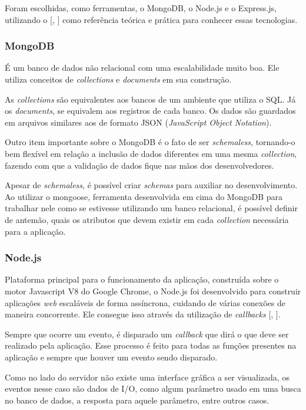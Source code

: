 \documentclass[
	12pt,				%
	oneside,			%
	a4paper,			%
	brazil				%
]{abntex2}
\newcommand{\citecustom}[1]{[\citeauthoronline{#1}, \citeyear{#1}]}
\begin{document}
Foram escolhidas, como ferramentas, o MongoDB, o Node.js e o Express.js, utilizando o \citecustom{Almeida2016} como referência teórica e prática para conhecer essas tecnologias.

\subsubsection{MongoDB}

É um banco de dados não relacional com uma escalabilidade muito boa. Ele utiliza conceitos de \textit{collections} e \textit{documents} em sua construção. 

As \textit{collections} são equivalentes aos bancos de um ambiente que utiliza o SQL. Já os \textit{documents}, se equivalem aos registros de cada banco. Os dados são guardados em arquivos similares aos de formato JSON (\textit{JavaScript Object Notation}).

Outro item importante sobre o MongoDB é o fato de ser \textit{schemaless}, tornando-o bem flexível em relação a inclusão de dados diferentes em uma mesma \textit{collection}, fazendo com que a validação de dados fique nas mãos dos desenvolvedores.

Apesar de \textit{schemaless}, é possível criar \textit{schemas} para auxiliar no desenvolvimento. Ao utilizar o mongoose, ferramenta desenvolvida em cima do MongoDB para trabalhar nele como se estivesse utilizando um banco relacional, é possível definir de antemão, quais os atributos que devem existir em cada \textit{collection} necessária para a aplicação.


\subsubsection{Node.js}

Plataforma principal para o funcionamento da aplicação, construída sobre o motor Javascript V8 do Google Chrome, o Node.js foi desenvolvido para construir aplicações \textit{web} escaláveis de forma assíncrona, cuidando de várias conexões de maneira concorrente. Ele consegue isso através da utilização de \textit{callbacks} \citecustom{Node2016}.

Sempre que ocorre um evento, é disparado um \textit{callback} que dirá o que deve ser realizado pela aplicação. Esse processo é feito para todas as funções presentes na aplicação e sempre que houver um evento sendo disparado.

Como no lado do servidor não existe uma interface gráfica a ser visualizada, os eventos nesse caso são dados de I/O, como algum parâmetro usado em uma busca no banco de dados, a resposta para aquele parâmetro, entre outros casos.
\end{document}
